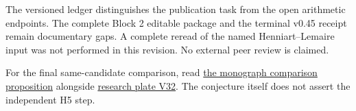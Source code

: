 The versioned ledger distinguishes the publication task from the open arithmetic endpoints. The complete Block 2 editable package and the terminal v0.45 receipt remain documentary gaps. A complete reread of the named Henniart--Lemaire input was not performed in this revision. No external peer review is claimed.

For the final same-candidate comparison, read \href{https://komorebi.invalid/b06/visual_comparison}{the monograph comparison proposition} alongside \href{https://komorebi.invalid/b06/visual_v32}{research plate V32}. The conjecture itself does not assert the independent H5 step.
